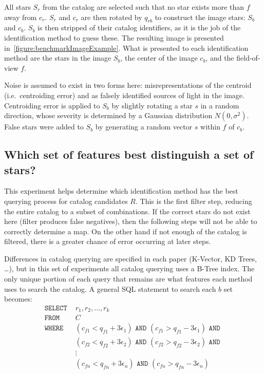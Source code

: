 All stars $S_r$ from the catalog are selected such that no star exists more than $f$ away from $c_r$.
$S_r$ and $c_r$ are then rotated by $q_{rb}$ to construct the image stars: $S_b$ and $c_b$.
$S_b$ is then stripped of their catalog identifiers, as it is the job of the identification method to guess these.
The resulting image is presented in~\autoref{figure:benchmarkImageExample}.
What is presented to each identification method are the stars in the image $S_b$, the center of the image $c_b$, and
the field-of-view $f$.

Noise is assumed to exist in two forms here: misrepresentations of the centroid (i.e.\ centroiding error) and as
falsely identified sources of light in the image.
Centroiding error is applied to $S_b$ by slightly rotating a star $s$ in a random direction, whose severity is
determined by a Gaussian distribution $N(0, \sigma^2)$.
False stars were added to $S_b$ by generating a random vector $s$ within $f$ of $c_b$.

\subsection{Which set of features best distinguish a set of stars?}\label{subsec:featureUniquenessMethods}
This experiment helps determine which identification method has the best querying process for catalog candidates $R$.
This is the first filter step, reducing the entire catalog to a subset of combinations.
If the correct stars do not exist here (filter produces false negatives), then the following steps will not be able to
correctly determine a map.
On the other hand if not enough of the catalog is filtered, there is a greater chance of error occurring at later steps.

Differences in catalog querying are specified in each paper (K-Vector, KD Trees, \ldots), but in this set of
experiments all catalog querying uses a B-Tree index.
The only unique portion of each query that remains are what features each method uses to search the catalog.
A general SQL statement to search each $b$ set becomes:
\begin{align*}
    \texttt{SELECT } &r_1, r_2, \ldots, r_k \\
    \texttt{FROM } &C \\
    \texttt{WHERE } &(c_{f1} < q_{f1} + 3\epsilon_1) \texttt{ AND } (c_{f1} > q_{f1} - 3\epsilon_1) \texttt{ AND } \\
    &(c_{f2} < q_{f2} + 3\epsilon_2) \texttt{ AND } (c_{f2} > q_{f2} - 3\epsilon_2) \texttt{ AND } \\
    &\vdots \\
    &(c_{fn} < q_{fn} + 3\epsilon_n) \texttt{ AND } (c_{fn} > q_{fn} - 3\epsilon_n)
\end{align*}

